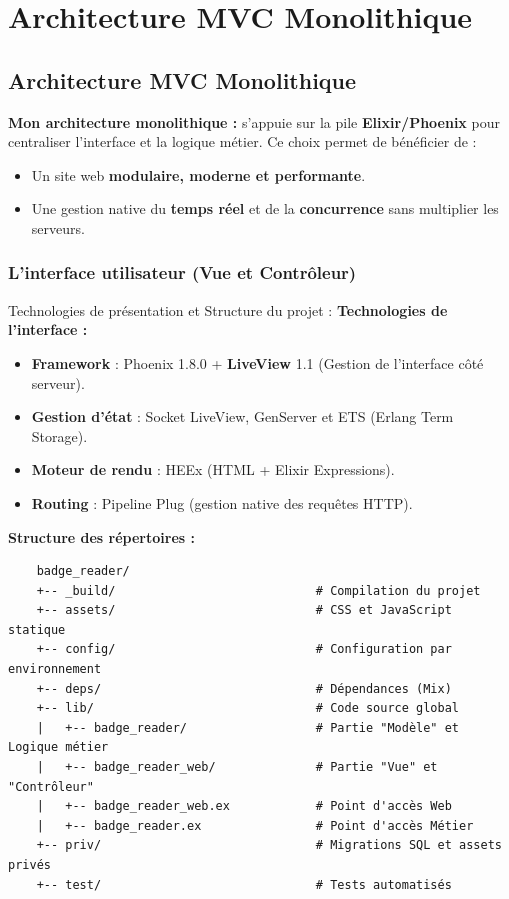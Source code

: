 \chapter{Architecture MVC Monolithique}

\section{Architecture MVC Monolithique}

\textbf{Mon architecture monolithique :} 
s'appuie sur la pile \textbf{Elixir/Phoenix} pour centraliser l'interface et la logique métier. Ce choix permet de bénéficier de :
\begin{itemize}
    \item Un site web \textbf{modulaire, moderne et performante}.
    \item Une gestion native du \textbf{temps réel} et de la \textbf{concurrence} sans multiplier les serveurs.
\end{itemize}

\subsection{L'interface utilisateur (Vue et Contrôleur)}

\begin{for_you}{Technologies de présentation et Structure du projet :}
    \textbf{Technologies de l'interface :}
    \begin{itemize}
        \item \textbf{Framework} : Phoenix 1.8.0 + \textbf{LiveView} 1.1 (Gestion de l'interface côté serveur).
        \item \textbf{Gestion d'état} : Socket LiveView, GenServer et ETS (Erlang Term Storage).
        \item \textbf{Moteur de rendu} : HEEx (HTML + Elixir Expressions).
        \item \textbf{Routing} : Pipeline Plug (gestion native des requêtes HTTP).
        \newline
    \end{itemize}

    \textbf{Structure des répertoires :}
    \begin{verbatim}
    badge_reader/
    +-- _build/                            # Compilation du projet
    +-- assets/                            # CSS et JavaScript statique
    +-- config/                            # Configuration par environnement
    +-- deps/                              # Dépendances (Mix)
    +-- lib/                               # Code source global
    |   +-- badge_reader/                  # Partie "Modèle" et Logique métier
    |   +-- badge_reader_web/              # Partie "Vue" et "Contrôleur"
    |   +-- badge_reader_web.ex            # Point d'accès Web
    |   +-- badge_reader.ex                # Point d'accès Métier
    +-- priv/                              # Migrations SQL et assets privés
    +-- test/                              # Tests automatisés
    \end{verbatim}
\end{for_you}

